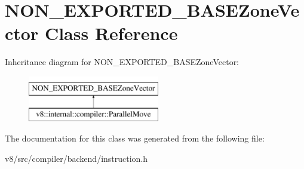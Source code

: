 \hypertarget{classNON__EXPORTED__BASEZoneVector}{}\section{N\+O\+N\+\_\+\+E\+X\+P\+O\+R\+T\+E\+D\+\_\+\+B\+A\+S\+E\+Zone\+Vector Class Reference}
\label{classNON__EXPORTED__BASEZoneVector}
Inheritance diagram for N\+O\+N\+\_\+\+E\+X\+P\+O\+R\+T\+E\+D\+\_\+\+B\+A\+S\+E\+Zone\+Vector\+:\begin{figure}[H]
\begin{center}
\leavevmode
\includegraphics[height=2.000000cm]{classNON__EXPORTED__BASEZoneVector}
\end{center}
\end{figure}


The documentation for this class was generated from the following file\+:\begin{DoxyCompactItemize}
\item 
v8/src/compiler/backend/instruction.\+h\end{DoxyCompactItemize}

